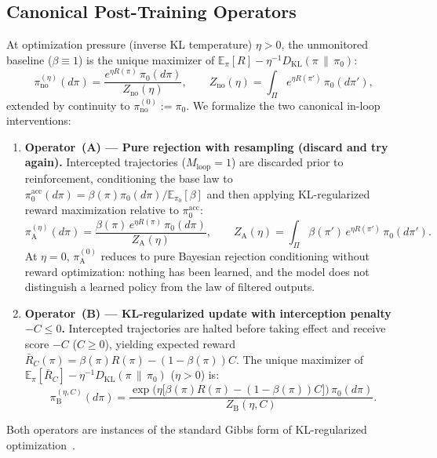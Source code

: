 \documentclass[11pt,a4paper]{article}
\newcommand{\E}{\mathbb{E}}
\newcommand{\DKL}{D_{\mathrm{KL}}}
\begin{document}
\subsection{Canonical Post-Training Operators}
At optimization pressure (inverse KL temperature) $\eta > 0$, the unmonitored baseline ($\beta \equiv 1$) is the unique maximizer of $\E_{\pi}[R] - \eta^{-1}\DKL(\pi \,\|\, \pi_0)$:
\begin{equation}
  \pi_{\mathrm{no}}^{(\eta)}(d\pi) = \frac{e^{\eta R(\pi)}\,\pi_0(d\pi)}{Z_{\mathrm{no}}(\eta)},
  \qquad Z_{\mathrm{no}}(\eta) = \int_{\Pi} e^{\eta R(\pi')}\,\pi_0(d\pi'),
\end{equation}
extended by continuity to $\pi_{\mathrm{no}}^{(0)} := \pi_0$. We formalize the two canonical in-loop interventions:
\begin{enumerate}
  \item \textbf{Operator~(A) --- Pure rejection with resampling (discard and try again).} Intercepted trajectories ($M_{\mathrm{loop}} = 1$) are discarded prior to reinforcement, conditioning the base law to $\pi_0^{\mathrm{acc}}(d\pi) = \beta(\pi)\pi_0(d\pi)/\E_{\pi_0}[\beta]$ and then applying KL-regularized reward maximization relative to $\pi_0^{\mathrm{acc}}$:
  \begin{equation}
    \pi_{\mathrm{A}}^{(\eta)}(d\pi) = \frac{\beta(\pi)\,e^{\eta R(\pi)}\,\pi_0(d\pi)}{Z_{\mathrm{A}}(\eta)},
    \qquad Z_{\mathrm{A}}(\eta) = \int_{\Pi} \beta(\pi')\,e^{\eta R(\pi')}\,\pi_0(d\pi').
  \end{equation}
  At $\eta = 0$, $\pi_{\mathrm{A}}^{(0)}$ reduces to pure Bayesian rejection conditioning without reward optimization: nothing has been learned, and the model does not distinguish a learned policy from the law of filtered outputs.
  \item \textbf{Operator~(B) --- KL-regularized update with interception penalty $-C \le 0$.} Intercepted trajectories are halted before taking effect and receive score $-C$ ($C \ge 0$), yielding expected reward $\bar{R}_C(\pi) = \beta(\pi)R(\pi) - (1-\beta(\pi))C$. The unique maximizer of $\E_{\pi}[\bar{R}_C] - \eta^{-1}\DKL(\pi \,\|\, \pi_0)$ ($\eta > 0$) is:
  \begin{equation}
    \pi_{\mathrm{B}}^{(\eta, C)}(d\pi) = \frac{\exp\!\big(\eta\big[\beta(\pi)R(\pi) - (1-\beta(\pi))C\big]\big)\,\pi_0(d\pi)}{Z_{\mathrm{B}}(\eta, C)}.
  \end{equation}
\end{enumerate}

Both operators are instances of the standard Gibbs form of KL-regularized optimization~\cite{korbak2022}.
\end{document}
